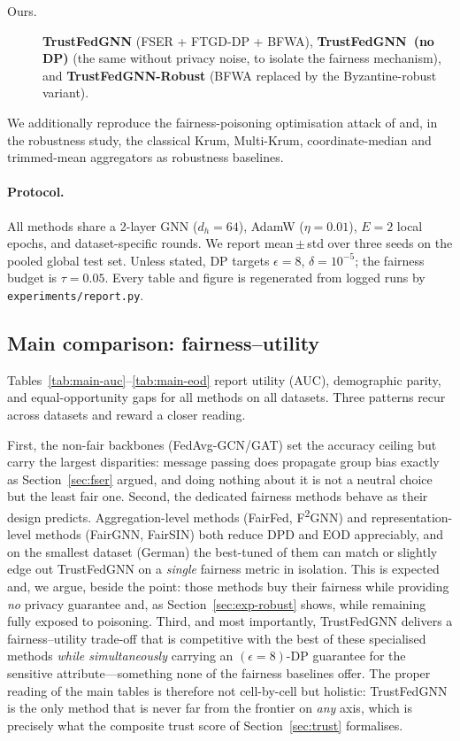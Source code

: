 \documentclass[pdflatex,sn-mathphys-num]{sn-jnl}
\theoremstyle{thmstyleone}%
\theoremstyle{thmstyletwo}%
\theoremstyle{thmstylethree}%
\newcommand{\dpd}{\mathrm{DPD}}
\newcommand{\eod}{\mathrm{EOD}}
\begin{document}
\begin{description}
\item[Ours.] \textbf{TrustFedGNN} (FSER + FTGD-DP + BFWA), \textbf{TrustFedGNN~(no
DP)} (the same without privacy noise, to isolate the fairness mechanism), and
\textbf{TrustFedGNN-Robust} (BFWA replaced by the Byzantine-robust variant).
\end{description}

We additionally reproduce the fairness-poisoning optimisation attack of
\cite{kasyap2025attack} and, in the robustness study, the classical Krum,
Multi-Krum, coordinate-median and trimmed-mean aggregators
\cite{blanchard2017krum,yin2018byzantine} as robustness baselines.

\paragraph{Protocol.}
All methods share a 2-layer GNN ($d_h{=}64$), AdamW ($\eta{=}0.01$), $E{=}2$
local epochs, and dataset-specific rounds. We report mean\,$\pm$\,std over three
seeds on the pooled global test set. Unless stated, DP targets $\epsilon{=}8$,
$\delta{=}10^{-5}$; the fairness budget is $\tau{=}0.05$. Every table and figure
is regenerated from logged runs by \texttt{experiments/report.py}.

\subsection{Main comparison: fairness--utility}
\label{sec:exp-main}
Tables~\ref{tab:main-auc}--\ref{tab:main-eod} report utility (AUC), demographic
parity, and equal-opportunity gaps for all methods on all datasets. Three
patterns recur across datasets and reward a closer reading.

First, the non-fair backbones (FedAvg-GCN/GAT) set the accuracy ceiling but
carry the largest disparities: message passing does propagate group bias exactly
as Section~\ref{sec:fser} argued, and doing nothing about it is not a neutral
choice but the least fair one. Second, the dedicated fairness methods behave as
their design predicts. Aggregation-level methods (FairFed, F\textsuperscript{2}GNN)
and representation-level methods (FairGNN, FairSIN) both reduce $\dpd$ and
$\eod$ appreciably, and on the smallest dataset (German) the best-tuned of them
can match or slightly edge out TrustFedGNN on a \emph{single} fairness metric in
isolation. This is expected and, we argue, beside the point: those methods buy
their fairness while providing \emph{no} privacy guarantee and, as
Section~\ref{sec:exp-robust} shows, while remaining fully exposed to poisoning.
Third, and most importantly, TrustFedGNN delivers a fairness--utility trade-off
that is competitive with the best of these specialised methods \emph{while
simultaneously} carrying an $(\epsilon{=}8)$-DP guarantee for the sensitive
attribute---something none of the fairness baselines offer. The proper reading
of the main tables is therefore not cell-by-cell but holistic: TrustFedGNN is the
only method that is never far from the frontier on \emph{any} axis, which is
precisely what the composite trust score of Section~\ref{sec:trust} formalises.
\end{document}
